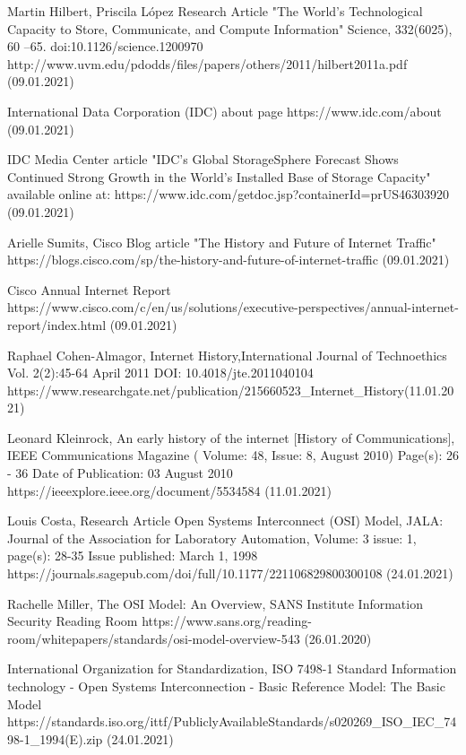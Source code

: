 \documentclass[magisterska,en]{pracamgr}
\begin{document}
\begin{thebibliography}{9}
Martin Hilbert, Priscila López
Research Article "The World’s Technological Capacity to Store, Communicate, and Compute Information" Science, 332(6025), 60 –65. doi:10.1126/science.1200970
http://www.uvm.edu/pdodds/files/papers/others/2011/hilbert2011a.pdf (09.01.2021)

International Data Corporation (IDC) about page
https://www.idc.com/about (09.01.2021)

IDC Media Center article "IDC's Global StorageSphere Forecast Shows Continued Strong Growth in the World's Installed Base of Storage Capacity" available online at: https://www.idc.com/getdoc.jsp?containerId=prUS46303920 (09.01.2021)

Arielle Sumits, Cisco Blog article "The History and Future of Internet Traffic"
https://blogs.cisco.com/sp/the-history-and-future-of-internet-traffic (09.01.2021)

Cisco Annual Internet Report
https://www.cisco.com/c/en/us/solutions/executive-perspectives/annual-internet-report/index.html (09.01.2021)

Raphael Cohen-Almagor, Internet History,International Journal of Technoethics Vol. 2(2):45-64
April 2011 
DOI: 10.4018/jte.2011040104
https://www.researchgate.net/publication/215660523\_Internet\_History(11.01.2021)



Leonard Kleinrock, An early history of the internet [History of Communications],  IEEE Communications Magazine ( Volume: 48, Issue: 8, August 2010) Page(s): 26 - 36
Date of Publication: 03 August 2010 
https://ieeexplore.ieee.org/document/5534584 (11.01.2021)
 
 
Louis Costa, Research Article Open Systems Interconnect (OSI) Model, JALA: Journal of the Association for Laboratory Automation, Volume: 3 issue: 1, page(s): 28-35
Issue published: March 1, 1998 
https://journals.sagepub.com/doi/full/10.1177/221106829800300108 (24.01.2021)

Rachelle Miller, The OSI Model: An Overview, SANS Institute Information Security Reading Room
https://www.sans.org/reading-room/whitepapers/standards/osi-model-overview-543 (26.01.2020)


International Organization for Standardization, ISO 7498-1 Standard Information technology - Open Systems Interconnection - Basic Reference Model: The Basic Model
https://standards.iso.org/ittf/PubliclyAvailableStandards/s020269\_ISO\_IEC\_7498-1\_1994(E).zip (24.01.2021)


\end{thebibliography}
\end{document}
